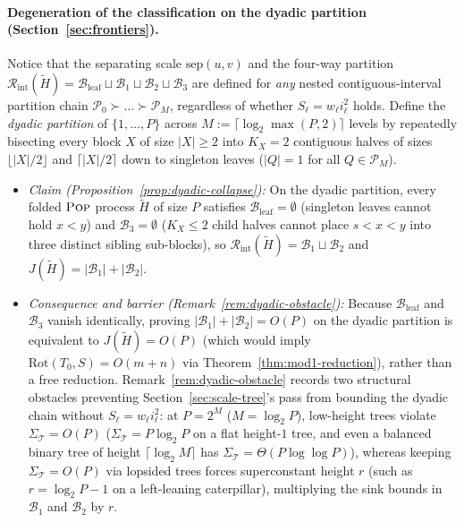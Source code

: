 \documentclass[11pt]{article}
\theoremstyle{definition}
\theoremstyle{remark}
\newcommand{\Rot}{\mathrm{Rot}}
\newcommand{\sep}{\mathrm{sep}}
\newcommand{\POP}{\textnormal{\scshape Pop}}
\begin{document}
\paragraph{Degeneration of the classification on the dyadic partition (Section~\ref{sec:frontiers}).}
Notice that the separating scale $\sep(u, v)$ and the four-way partition $\mathcal{R}_{\mathrm{int}}(\widetilde{H}) = \mathcal{B}_{\mathrm{leaf}} \sqcup \mathcal{B}_1 \sqcup \mathcal{B}_2 \sqcup \mathcal{B}_3$ are defined for \emph{any} nested contiguous-interval partition chain $\mathcal{P}_0 \succ \dots \succ \mathcal{P}_M$, regardless of whether $S_\ell = w_\ell i_\ell^2$ holds. Define the \emph{dyadic partition} of $\{1, \dots, P\}$ across $M := \lceil \log_2 \max(P, 2) \rceil$ levels by repeatedly bisecting every block $X$ of size $|X| \ge 2$ into $K_X = 2$ contiguous halves of sizes $\lfloor |X|/2 \rfloor$ and $\lceil |X|/2 \rceil$ down to singleton leaves ($|Q| = 1$ for all $Q \in \mathcal{P}_M$).
\begin{itemize}[leftmargin=2em, itemsep=2pt]
  \item \emph{Claim (Proposition~\ref{prop:dyadic-collapse}):} On the dyadic partition, every folded $\POP$ process $\widetilde{H}$ of size $P$ satisfies $\mathcal{B}_{\mathrm{leaf}} = \emptyset$ (singleton leaves cannot hold $x < y$) and $\mathcal{B}_3 = \emptyset$ ($K_X \le 2$ child halves cannot place $s < x < y$ into three distinct sibling sub-blocks), so $\mathcal{R}_{\mathrm{int}}(\widetilde{H}) = \mathcal{B}_1 \sqcup \mathcal{B}_2$ and $J(\widetilde{H}) = |\mathcal{B}_1| + |\mathcal{B}_2|$.
  \item \emph{Consequence and barrier (Remark~\ref{rem:dyadic-obstacle}):} Because $\mathcal{B}_{\mathrm{leaf}}$ and $\mathcal{B}_3$ vanish identically, proving $|\mathcal{B}_1| + |\mathcal{B}_2| = O(P)$ on the dyadic partition is equivalent to $J(\widetilde{H}) = O(P)$ (which would imply $\Rot(T_0, S) = O(m + n)$ via Theorem~\ref{thm:mod1-reduction}), rather than a free reduction. Remark~\ref{rem:dyadic-obstacle} records two structural obstacles preventing Section~\ref{sec:scale-tree}'s pass from bounding the dyadic chain without $S_\ell = w_\ell i_\ell^2$: at $P = 2^M$ ($M = \log_2 P$), low-height trees violate $\Sigma_{\mathcal{T}} = O(P)$ ($\Sigma_{\mathcal{T}} = P \log_2 P$ on a flat height-$1$ tree, and even a balanced binary tree of height $\lceil \log_2 M \rceil$ has $\Sigma_{\mathcal{T}} = \Theta(P \log\log P)$), whereas keeping $\Sigma_{\mathcal{T}} = O(P)$ via lopsided trees forces superconstant height $r$ (such as $r = \log_2 P - 1$ on a left-leaning caterpillar), multiplying the sink bounds in $\mathcal{B}_1$ and $\mathcal{B}_2$ by $r$.
\end{itemize}
\end{document}
